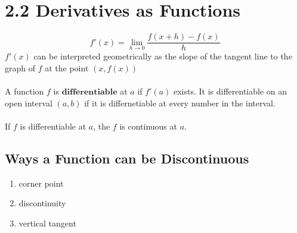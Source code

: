 %
%

\section*{2.2 Derivatives as Functions}

$$f'(x)=\lim_{h \to 0}\frac{f(x+h)-f(x)}{h}$$
\(f'(x)\) can be interpreted geometrically as the slope of the tangent line to the graph of \(f\) at the point \((x, f(x))\)
\\\\
A function \(f\) is \(\textbf{differentiable}\) at \(a\) if \(f'(a)\) exists. It is differentiable on an open interval \((a,b)\) if it is differnetiable at every number in the interval.
\\\\
If \(f\) is differentiable at \(a\), the \(f\) is continuous at \(a\).

\subsection*{Ways a Function can be Discontinuous}

\begin{enumerate}
    \item corner point
    \item discontinuity
    \item vertical tangent
\end{enumerate}

